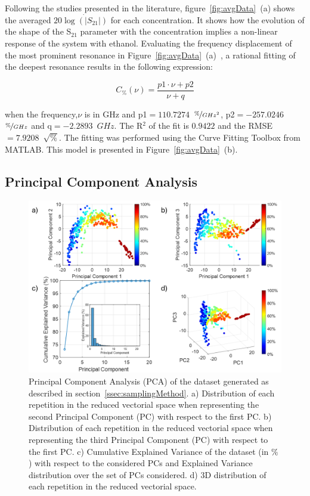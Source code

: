 \documentclass[journal,twoside,web]{ieeecolor}
\begin{document}
Following the studies presented in the literature, figure~\ref{fig:avgData}~(a) shows the averaged $20\dot{\log\left(|S_{21}|\right)}$ for each concentration. It shows how the evolution of the shape of the S$_{21}$ parameter with the concentration implies a non-linear response of the system with ethanol. Evaluating the frequency displacement of the most prominent resonance in Figure~\ref{fig:avgData}~(a)~\cite{Abdolrazzaghi2023}, a rational fitting of the deepest resonance results in the following expression:

\begin{equation}
	\label{eq:frequFitt}
	 C_{\%}(\nu) = \frac{p1\cdot\nu+p2}{\nu+q} 
\end{equation} 

when the frequency,$\nu$ is in GHz and p1$=110.7274$~$\nicefrac{\%}{GHz^{2}}$, p2$=-257.0246$~$\nicefrac{\%}{GHz}$ and q$=-2.2893$~$GHz$. The R$^{2}$ of the fit is $0.9422$ and the RMSE$=7.9208$~$\sqrt{\%}$. The fitting was performed using the Curve Fitting Toolbox from MATLAB. This model is presented in Figure~\ref{fig:avgData}~(b).

\subsection{Principal Component Analysis}
\label{ssec:pcaAnalysis}

\begin{figure}[!t]
	\centering
	\includegraphics [trim = 0mm 0mm 0mm 0mm, clip, width=1\columnwidth]{figures/fig5_3.png}
	\caption{Principal Component Analysis (PCA) of the dataset generated as described in section~\ref{ssec:samplingMethod}. a) Distribution of each repetition in the reduced vectorial space when representing the second Principal Component (PC) with respect to the first PC. b) Distribution of each repetition in the reduced vectorial space when representing the third Principal Component (PC) with respect to the first PC. c) Cumulative Explained Variance of the dataset (in $\%$) with respect to the considered PCs and Explained Variance distribution over the set of PCs considered. d) 3D distribution of each repetition in the reduced vectorial space.}
	\label{fig:pcaAnalysis}
\end{figure}
\end{document}
